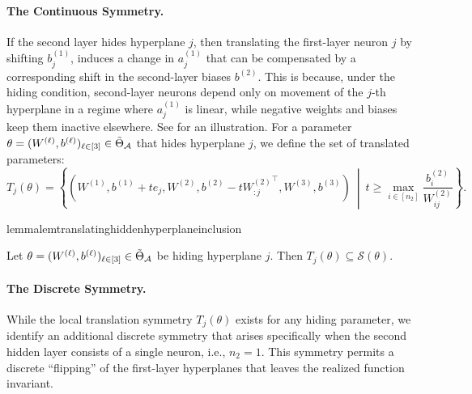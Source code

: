 \documentclass{article}
\theoremstyle{definition}
\newcommand{\architecture}{\mathcal{A}}
\newcommand{\gparamspace}[1]{\Tilde{\Theta}_{#1}}
\newcommand{\weights}[1]{W^{(#1)}}
\newcommand{\bias}[1]{b^{(#1)}}
\newcommand{\activation}[1]{a^{(#1)}}
\newcommand{\fiber}[1]{\mathcal{S}({#1})}
\begin{document}
\paragraph{The Continuous Symmetry.}  

If the second layer hides hyperplane $j$, then translating the first-layer neuron $j$ by shifting $\bias{1}_j$, induces a change in $\activation{1}_j$ that can be 
compensated by a corresponding shift in the second-layer biases $\bias{2}$. 
This is because, under the hiding condition, second-layer neurons depend only on movement of the $j$-th hyperplane in a regime where $\activation{1}_j$ is linear, while negative weights and biases keep them inactive elsewhere. 
 See  for an illustration. 
 For a parameter $\theta = (\weights{\ell},\bias{\ell})_{\ell \in [3]} \in \gparamspace{\architecture}$ 
 that hides hyperplane $j$, we define the set of translated parameters: 
 \begin{equation}
 \label{eq:translated_hyperplane}
     T_j(\theta) = \left\{
(\weights{1},
\bias{1}+t e_j,
\weights{2},
\bias{2}-t
{\weights{2}_{:j}}^\top
,
\weights{3},\bias{3})
\ \middle|\
t \geq \max_{i \in [n_2]} \frac{\bias{2}_i}{\weights{2}_{i j}}
\right\}. 
 \end{equation}


\begin{restatable}{lemma}{lemtranslatinghiddenhyperplaneinclusion}

\label{lem:translating_hidden_hyperplane_inclusion}
Let $\theta = (\weights{\ell},\bias{\ell})_{\ell \in [3]} \in \gparamspace{\architecture}$ be hiding hyperplane $j$. 
Then \(
T_j(\theta) \subseteq \fiber{\theta} \). 
\end{restatable} 


\paragraph{The Discrete Symmetry.} 

While the local translation symmetry $T_j(\theta)$ exists for any hiding parameter, we identify an additional discrete symmetry that arises specifically when the second hidden layer consists of a single neuron, i.e., $n_2=1$. 
%
This symmetry permits a discrete ``flipping'' of the first-layer hyperplanes that leaves the realized function invariant.
\end{document}
